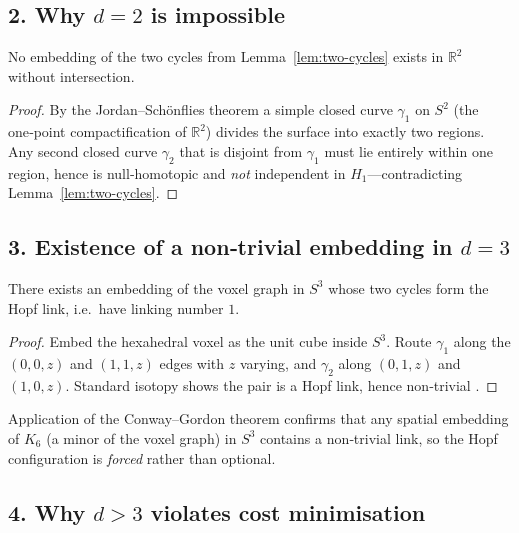\subsection*{2.  Why $d=2$ is impossible}

\begin{lemma}[$d=2$ exclusion]
\label{lem:d2-exclusion}
No embedding of the two cycles from Lemma~\ref{lem:two-cycles} exists in
$\mathbb R^{2}$ without intersection.
\end{lemma}

\begin{proof}
By the Jordan–Schönflies theorem a simple closed curve $\gamma_{1}$ on
$S^{2}$ (the one‑point compactification of $\mathbb R^{2}$) divides the
surface into exactly two regions.  Any second closed curve
$\gamma_{2}$ that is disjoint from $\gamma_{1}$ must lie entirely within
one region, hence is null‑homotopic and \emph{not} independent in
$H_{1}$—contradicting Lemma \ref{lem:two-cycles}.
\end{proof}

\subsection*{3.  Existence of a non‑trivial embedding in $d=3$}

\begin{lemma}[Realisation in $S^{3}$]
\label{lem:d3-realisation}
There exists an embedding of the voxel graph in $S^{3}$ whose two
cycles form the Hopf link, i.e.\ have linking number $1$.
\end{lemma}

\begin{proof}
Embed the hexahedral voxel as the unit cube inside $S^{3}$.
Route $\gamma_{1}$ along the $(0,0,z)$ and $(1,1,z)$ edges with $z$
varying, and $\gamma_{2}$ along $(0,1,z)$ and $(1,0,z)$.
Standard isotopy shows the pair is a Hopf link, hence non‑trivial \cite{Lickorish1997}.
\end{proof}

Application of the Conway–Gordon theorem \cite[Thm.\,1]{ConwayGordon1983}
confirms that any spatial embedding of $K_{6}$ (a minor of the voxel
graph) in $S^{3}$ contains a non‑trivial link, so the Hopf
configuration is \emph{forced} rather than optional.

\subsection*{4.  Why $d>3$ violates cost minimisation}

